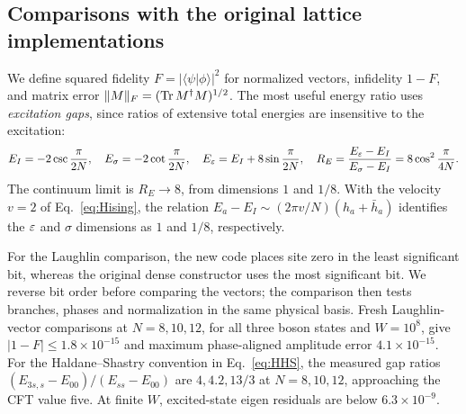 \subsection{Comparisons with the original lattice implementations}
\label{sec:state-comparisons}
We define squared fidelity $F=|\langle\psi|\phi\rangle|^2$ for normalized
vectors, infidelity $1-F$, and matrix error
$\|M\|_F=(\operatorname{Tr} M^\dagger M)^{1/2}$. The most useful energy ratio uses
\emph{excitation gaps}, since ratios of extensive total energies are
insensitive to the excitation:
\begin{equation}
 E_I=-2\csc\frac\pi{2N},\quad E_\sigma=-2\cot\frac\pi{2N},\quad
 E_\varepsilon=E_I+8\sin\frac\pi{2N},\quad
 R_E=\frac{E_\varepsilon-E_I}{E_\sigma-E_I}=8\cos^2\frac\pi{4N}.
 \label{eq:gaps}
\end{equation}
The continuum limit is $R_E\to8$, from dimensions $1$ and $1/8$.
With the velocity $v=2$ of Eq.~\eqref{eq:Hising}, the relation
$E_a-E_I\sim(2\pi v/N)(h_a+\bar h_a)$ identifies
the $\eps$ and $\sigma$ dimensions as $1$ and $1/8$, respectively.

\begin{table}[htbp]\centering\small

\caption{Fresh full-vector comparisons with archived puMPS checkpoints.
$D_{\rm bond}$ is the MPS bond dimension, distinct from relative entropy.
The seed is $1234+N$ in the archived optimization. $I$ and $\eps$ use pure
CB vectors, while $\sigma$ uses Eq.~\eqref{eq:projection}. All vectors
are normalized, all energies use Eq.~\eqref{eq:Hising}, and the interval
matrix comparison has $\ell=4$. Every reported infidelity is below
$4.0\times10^{-7}$. No puMPS reoptimization is claimed.}
\label{tab:pumps}
\end{table}

For the Laughlin comparison, the new code places site zero in the least
significant bit, whereas the original dense constructor uses the most
significant bit. We reverse bit order before comparing the vectors;
the comparison then tests branches, phases and normalization in the
same physical basis.
Fresh Laughlin-vector comparisons at $N=8,10,12$, for all three boson
states and $W=10^8$, give $|1-F|\leq1.8\times10^{-15}$ and maximum
phase-aligned amplitude error $4.1\times10^{-15}$.
For the Haldane--Shastry convention in Eq.~\eqref{eq:HHS}, the measured
gap ratios $(E_{3s,s}-E_{00})/(E_{ss}-E_{00})$ are
$4,4.2,13/3$ at $N=8,10,12$, approaching the CFT value five.
At finite $W$, excited-state eigen residuals are below $6.3\times10^{-9}$.

